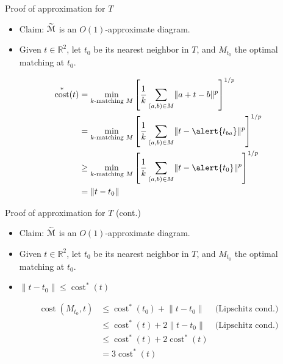 \documentclass[xcolor={dvipsnames,usenames},handout]{beamer} %
\newcommand{\reals}{\mathbb{R}}
\def\norm#1{\mathopen\| #1 \mathclose\|}	%
\DeclareMathOperator{\cost}{cost}
\newcommand{\tildeM}{\widetilde{\EuScript{M}}}
\begin{document}
\begin{frame}{Proof of approximation for $T$}
\begin{itemize}
\item Claim: $\tildeM$ is an $O(1)$-approximate diagram.
\item Given $t \in \reals^2$, let $t_0$ be its nearest neighbor in $T$, and $M_{t_0}$ the optimal matching at $t_0$.
\end{itemize}
\begin{equation*}
\begin{aligned}
\cost^*(t) &= \min_{\text{$k$-matching $M$}} \left[\frac{1}{k}\sum_{(a, b) \in M}\norm{a+t-b}^p\right]^{1/p} \\
	&= \min_{\text{$k$-matching $M$}} \left[\frac{1}{k}\sum_{(a, b) \in M}\norm{t - \alert{t_{ba}}}^p\right]^{1/p} \\
	&\geq \min_{\text{$k$-matching $M$}} \left[\frac{1}{k}\sum_{(a, b) \in M}\norm{t - \alert{t_0}}^p\right]^{1/p} \\
	&= \norm{t - t_0}
\end{aligned}
\end{equation*}
\end{frame}

\begin{frame}{Proof of approximation for $T$ (cont.)}
\begin{itemize}
\item Claim: $\tildeM$ is an $O(1)$-approximate diagram.
\item Given $t \in \reals^2$, let $t_0$ be its nearest neighbor in $T$, and $M_{t_0}$ the optimal matching at $t_0$.
\item $\norm{t - t_0} \leq \cost^*(t)$
\end{itemize}
\begin{equation*}
\begin{aligned}
\cost(M_{t_0}, t) &\leq \cost^*(t_0) + \norm{t - t_0} & \text{(Lipschitz cond.)}\\
	&\leq \cost^*(t) + 2\norm{t - t_0} & \text{(Lipschitz cond.)}\\
	&\leq \cost^*(t) + 2\cost^*(t) \\
	&= 3\cost^*(t)
\end{aligned}
\end{equation*}
\end{frame}
\end{document}
